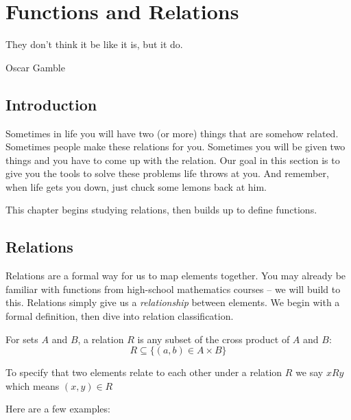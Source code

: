 \documentclass[main.tex]{subfiles}
\begin{document}
\chapter{Functions and Relations}

\epigraph{They don't think it be like it is, but it do.}{Oscar Gamble}

\minitoc

\section{Introduction}

Sometimes in life you will have two (or more) things that are somehow related. Sometimes people make these relations for you. Sometimes you will be given two things and you have to come up with the relation. Our goal in this section is to give you the tools to solve these problems life throws at you. And remember, when life gets you down, just chuck some lemons back at him.

This chapter begins studying relations, then builds up to define functions.

\section{Relations}


Relations are a formal way for us to map elements together. You may already be familiar with functions from high-school mathematics courses -- we will build to this. Relations simply give us a \textit{relationship} between elements. We begin with a formal definition, then dive into relation classification.

\begin{defn}
	For sets \(A\) and \(B\), a relation \(R\) is any subset of the cross product of \(A\) and \(B\): \[R \subseteq \{(a,b) \in A \times B\}\]
	
	To specify that two elements relate to each other under a relation \(R\) we say \(xRy\) which means \((x,y) \in R\)
\end{defn}

Here are a few examples:
\end{document}
